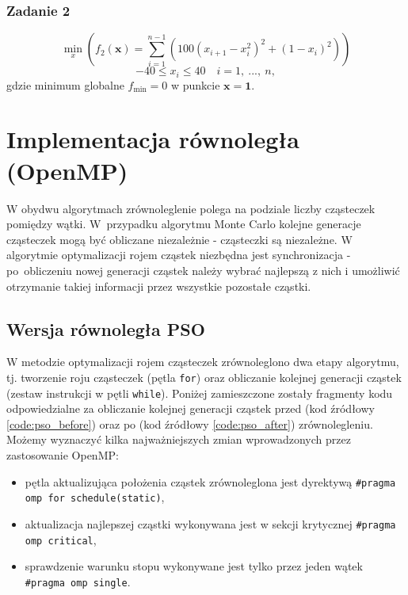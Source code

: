 \documentclass[11pt, a4paper, oneside]{article}
\newcommand{\vect}[1]{\bm{\mathbf{#1}}}
\begin{document}
\subsubsection{Zadanie 2}
\begin{equation}
\min_{x} \left(f_{2}\left(\vect{x}\right) = \sum_{i=1}^{n-1}\left(100\left(x_{i+1}-x_{i}^{2}\right)^{2} + \left(1-x_{i}\right)^{2} \right) \right)
\end{equation}
\begin{equation}
-40 \leq x_{i} \leq 40 \quad i = 1, \ ..., \ n,
\end{equation}
gdzie minimum globalne $f_{\mathrm{min}} = 0$ w punkcie $\vect{x} = \vect{1}$.

\section{Implementacja równoległa (OpenMP)}

W obydwu algorytmach zrównoleglenie polega na podziale liczby cząsteczek pomiędzy wątki. W~przypadku algorytmu Monte Carlo kolejne generacje cząsteczek mogą być obliczane niezależnie - cząsteczki są niezależne. W algorytmie optymalizacji rojem cząstek niezbędna jest synchronizacja - po~obliczeniu nowej generacji cząstek należy wybrać najlepszą z nich i umożliwić otrzymanie takiej informacji przez wszystkie pozostałe cząstki.

\subsection{Wersja równoległa PSO}

W metodzie optymalizacji rojem cząsteczek zrównoleglono dwa etapy algorytmu, tj. tworzenie roju cząsteczek (pętla \lstinline[style=mycpp]{for}) oraz obliczanie kolejnej generacji cząstek (zestaw instrukcji w pętli \lstinline[style=mycpp]{while}). Poniżej zamieszczone zostały fragmenty kodu odpowiedzialne za obliczanie kolejnej generacji cząstek przed (kod źródłowy \ref{code:pso_before}) oraz po (kod źródłowy \ref{code:pso_after}) zrównolegleniu. Możemy wyznaczyć kilka najważniejszych zmian wprowadzonych przez zastosowanie OpenMP:\nopagebreak
\begin{itemize}
\item pętla aktualizująca położenia cząstek zrównoleglona jest dyrektywą \lstinline[style=mycpp]{#pragma omp for schedule(static)},
\item aktualizacja najlepszej cząstki wykonywana jest w sekcji krytycznej \lstinline[style=mycpp]{#pragma omp critical},
\item sprawdzenie warunku stopu wykonywane jest tylko przez jeden wątek \lstinline[style=mycpp]{#pragma omp single}.
\end{itemize}
\end{document}
